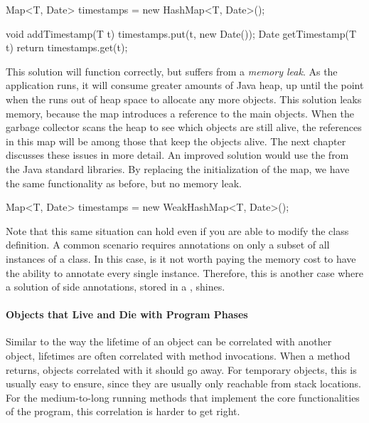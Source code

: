 \begin{shortlisting}
Map<T, Date> timestamps = new HashMap<T, Date>();

void addTimestamp(T t) {
	timestamps.put(t, new Date());
}
Date getTimestamp(T t) {
	return timestamps.get(t);
}
\end{shortlisting}

This solution will function correctly, but suffers from a \emph{memory
leak}. As the application runs, it will consume greater
amounts of Java heap, up until the point when the \jre runs out of heap space to
allocate any more objects. This solution leaks memory, because the
 map introduces a reference to the main objects. When the
garbage collector scans the heap to see which objects are still alive, the
references in this map will be among those that keep the objects alive. The next
chapter discusses these issues in more detail. An improved solution would use the
 from the Java standard libraries. By replacing the
initialization of the  map, we have the same functionality as
before, but no memory leak.

\begin{shortlisting}
Map<T, Date> timestamps = new WeakHashMap<T, Date>();
\end{shortlisting}

Note that this same situation can hold even if you are able to modify the class
definition. A common scenario requires annotations on only a subset of all
instances of a class. In this case, is it not worth paying the memory cost to
have the ability to annotate every single instance. Therefore, this is another
case where a solution of side annotations, stored in a ,
shines.

\paragraph{Objects that Live and Die with Program Phases}
\label{sec:correlated-lifetime-2}

Similar to the way the lifetime of an object can be correlated with another
object, lifetimes are often correlated with method invocations. When a method
returns, objects correlated with it should go away. For temporary objects, this
is usually easy to ensure, since they are usually only reachable from stack
locations. For the medium-to-long running methods that implement the
core functionalities of the program, this correlation is harder to get right.

